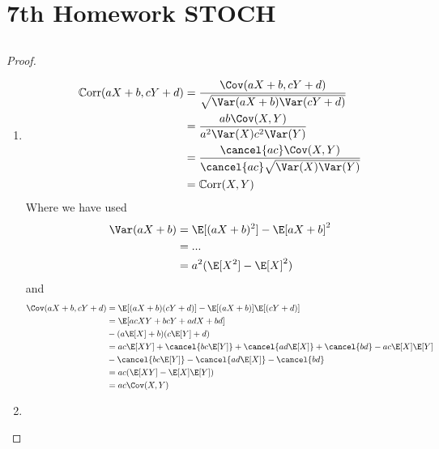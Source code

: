 
\section{7th Homework STOCH}
\subsection{}
\begin{proof}
	\begin{enumerate}
		\item \begin{align*}
			\Corr(aX + b,cY+d) &= \frac{\Cov(aX+b, cY+d)}{\sqrt{\Var(aX+b)\Var(cY+d)}}\\
			&= \frac{ab\Cov(X,Y)}{a^2\Var(X)c^2\Var(Y)}\\
			&= \frac{\cancel{ac}\Cov(X,Y)}{\cancel{ac}\sqrt{\Var(X)\Var(Y)}}\\
			&= \Corr(X,Y)
		\end{align*}
		Where we have used
		\begin{align*}
			\Var(aX+b) &= \E[(aX+b)^2]- \E[aX+b]^2\\
			&= ...\\ %
			&= a^2(\E[X^2] - \E[X]^2)
		\end{align*}
		and 
		\begin{align*}
			\Cov(aX+b,cY+d) &= \E[(aX+b)(cY+d)]-\E[(aX+b)]\E[(cY+d)]\\
			&= \E[acXY + bcY + adX + bd] \\
			&- (a\E[X]+b)(c\E[Y]+d)\\
			&= ac\E[XY]+\cancel{bc\E[Y]} + \cancel{ad\E[X]} + \cancel{bd} - ac\E[X]\E[Y]\\
			&- \cancel{bc \E[Y]} - \cancel{ad\E[X]} - \cancel{bd}\\
			&= ac(\E[XY] - \E[X]\E[Y])\\
			&= ac\Cov(X,Y)
		\end{align*}
		\item 
	\end{enumerate}
\end{proof}

